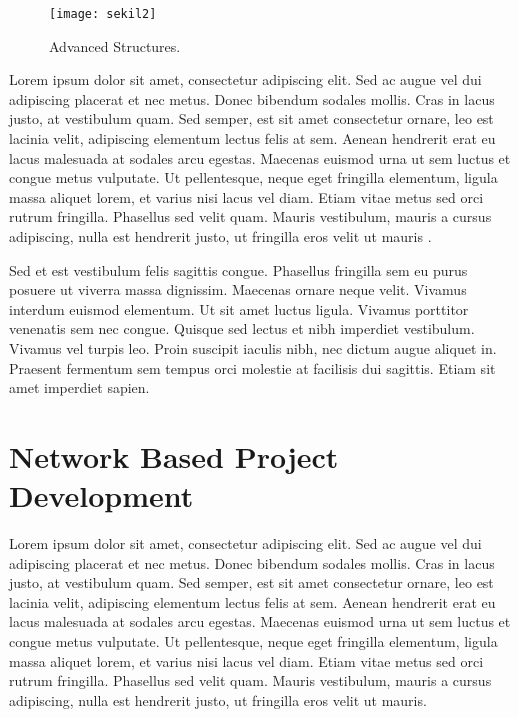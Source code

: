 \begin{figure}
 \centering
 \texttt{[image: sekil2]}
 \vspace*{4mm}
 \caption{Advanced Structures.}
 \label{fig:ch2-1}
\end{figure}

Lorem ipsum dolor sit amet, consectetur adipiscing elit. Sed ac augue vel dui 
adipiscing placerat et nec metus. Donec bibendum sodales mollis. Cras in lacus 
justo, at vestibulum quam. Sed semper, est sit amet consectetur ornare, leo est 
lacinia velit, adipiscing elementum lectus felis at sem. Aenean hendrerit erat eu 
lacus malesuada at sodales arcu egestas. Maecenas euismod urna ut sem luctus et 
congue metus vulputate. Ut pellentesque, neque eget fringilla elementum, ligula 
massa aliquet lorem, et varius nisi lacus vel diam. Etiam vitae metus sed orci 
rutrum fringilla. Phasellus sed velit quam. Mauris vestibulum, mauris a cursus 
adipiscing, nulla est hendrerit justo, ut fringilla eros velit ut mauris 
\cite{Wegener2000629}.

Sed et est vestibulum felis sagittis congue. Phasellus fringilla sem eu purus 
posuere ut viverra massa dignissim. Maecenas ornare neque velit. Vivamus interdum 
euismod elementum. Ut sit amet luctus ligula. Vivamus porttitor venenatis sem nec 
congue. Quisque sed lectus et nibh imperdiet vestibulum. Vivamus vel turpis leo. 
Proin suscipit iaculis nibh, nec dictum augue aliquet in. Praesent fermentum sem 
tempus orci molestie at facilisis dui sagittis. Etiam sit amet imperdiet sapien. 

\newpage
\section{Network Based Project Development}

Lorem ipsum dolor sit amet, consectetur adipiscing elit. Sed ac augue vel dui 
adipiscing placerat et nec metus. Donec bibendum sodales mollis. Cras in lacus 
justo, at vestibulum quam. Sed semper, est sit amet consectetur ornare, leo est 
lacinia velit, adipiscing elementum lectus felis at sem. Aenean hendrerit erat eu 
lacus malesuada at sodales arcu egestas. Maecenas euismod urna ut sem luctus et 
congue metus vulputate. Ut pellentesque, neque eget fringilla elementum, ligula 
massa aliquet lorem, et varius nisi lacus vel diam. Etiam vitae metus sed orci 
rutrum fringilla. Phasellus sed velit quam. Mauris vestibulum, mauris a cursus 
adipiscing, nulla est hendrerit justo, ut fringilla eros velit ut mauris.

